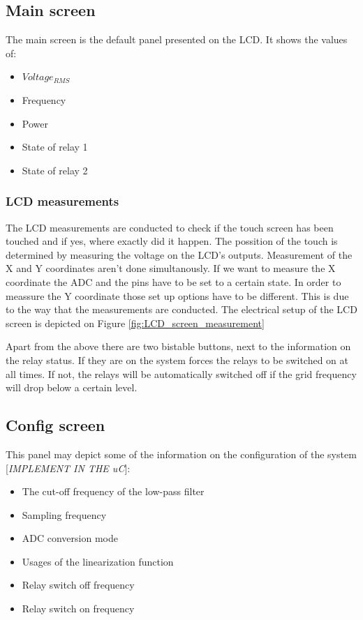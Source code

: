 \subsection{Main screen}
The main screen is the default panel presented on the LCD. It shows the values of:
\begin{itemize}
\item $ Voltage_{RMS} $
\item Frequency
\item Power
\item State of relay 1
\item State of relay 2
\end{itemize}
\subsubsection{LCD measurements}
The LCD measurements are conducted to check if the touch screen has been touched and if yes, where exactly did it happen. The possition of the touch is determined by measuring the voltage on the LCD's outputs. Measurement of the X and Y coordinates aren't done simultanously. If we want to measure the X coordinate the ADC and the pins have to be set to a certain state. In order to meassure the Y coordinate those set up options have to be different. This is due to the way that the measurements are conducted. The electrical setup of the LCD screen is depicted on Figure \ref{fig:LCD_screen_measurement}

Apart from the above there are two bistable buttons, next to the information on the relay status. If they are on the system forces the relays to be switched on at all times. If not, the relays will be automatically  switched off if the grid frequency will drop below a certain level.

\subsection{Config screen}
This panel may depict some of the information on the configuration of the system [\emph{IMPLEMENT IN THE uC}]:
\begin{itemize}
\item The cut-off frequency of the low-pass filter
\item Sampling frequency
\item ADC conversion mode
\item Usages of the linearization function
\item Relay switch off frequency
\item Relay switch on frequency
\end{itemize}

